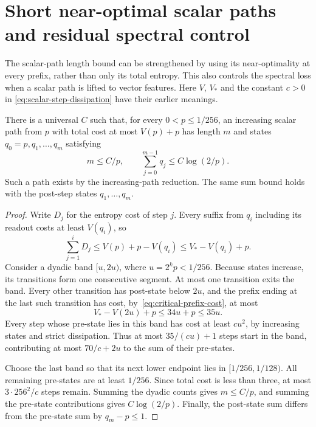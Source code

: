 \section{Short near-optimal scalar paths and residual spectral control}
\label{sec:critical-short-path-control}

The scalar-path length bound can be strengthened by using its
near-optimality at every prefix, rather than only its total entropy.
This also controls the spectral loss when a scalar path is lifted to
vector features. Here $V$, $V_*$ and the constant $c>0$ in
\eqref{eq:scalar-step-dissipation} have their earlier meanings.

\begin{lemma}
\label{lem:critical-dyadic-short-path}
There is a universal $C$ such that, for every $0<p\le1/256$, an
increasing scalar path from $p$ with total cost at most $V(p)+p$ has
length $m$ and states $q_0=p,q_1,\ldots,q_m$ satisfying
\[
 m\le C/p,\qquad
 \sum_{j=0}^{m-1}q_j\le C\log(2/p).
\]
Such a path exists by the increasing-path reduction. The same sum bound
holds with the post-step states $q_1,\ldots,q_m$.
\end{lemma}

\begin{proof}
Write $D_j$ for the entropy cost of step $j$. Every suffix from $q_i$
including its readout costs at least $V(q_i)$, so
\begin{equation}\label{eq:critical-prefix-cost}
 \sum_{j=1}^{i}D_j
 \le V(p)+p-V(q_i)\le V_*-V(q_i)+p.
\end{equation}
Consider a dyadic band $[u,2u)$, where $u=2^kp<1/256$.
Because states increase, its transitions form one consecutive segment.
At most one transition exits the band. Every other transition has
post-state below $2u$, and the prefix ending at the last such transition
has cost, by~\eqref{eq:critical-prefix-cost}, at most
\[
 V_*-V(2u)+p\le34u+p\le35u.
\]
Every step whose pre-state lies in this band has cost at least $cu^2$,
by increasing states and strict dissipation. Thus at most
$35/(cu)+1$ steps start in the band, contributing at most $70/c+2u$
to the sum of their pre-states.

Choose the last band so that its next lower endpoint lies in
$[1/256,1/128)$. All remaining pre-states are at least $1/256$.
Since total cost is less than three, at most $3\cdot256^2/c$
steps remain. Summing the dyadic counts gives $m\le C/p$, and summing
the pre-state contributions gives $C\log(2/p)$.
Finally, the post-state sum differs from the pre-state sum by
$q_m-p\le1$.
\end{proof}

